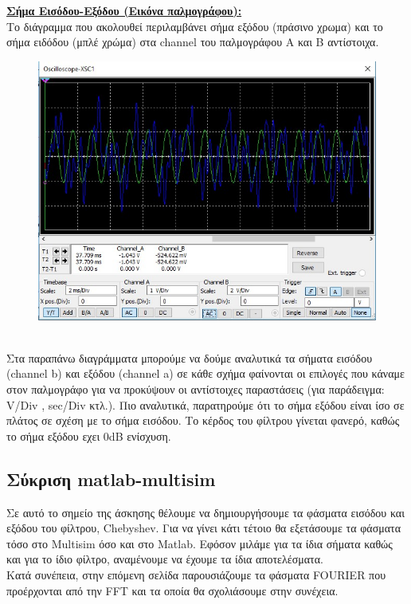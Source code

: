 \documentclass{article}
\begin{document}
{\begin{figure}[h!]
\end{figure} 
 \clearpage
 \textbf{\underline{Σήμα Εισόδου-Εξόδου (Εικόνα παλμογράφου):}} 
 \\[1.4\baselineskip]
 Το διάγραμμα που ακολουθεί περιλαμβάνει  σήμα εξόδου (πράσινο χρωμα) και το σήμα ειδόδου (μπλέ χρώμα) στα channel του παλμογράφου Α και Β αντίστοιχα.  \\[0.4\baselineskip]
 \begin{figure}[h!]
\centering
 	\advance\leftskip-0.7cm
  \includegraphics[width=140mm,scale=2]{thema2/multisim10.jpg}
\end{figure}   \\[1.4\baselineskip]
Στα παραπάνω διαγράμματα μπορούμε να δούμε αναλυτικά τα σήματα εισόδου (channel b) και εξόδου (channel a) σε κάθε σχήμα φαίνονται οι επιλογές που κάναμε στον παλμογράφο για να προκύψουν οι αντίστοιχες παραστάσεις (για παράδειγμα: V/Div ,  sec/Div κτλ.).
Πιο αναλυτικά, παρατηρούμε ότι το σήμα εξόδου είναι ίσο σε πλάτος σε σχέση με το σήμα εισόδου. Το κέρδος του φίλτρου γίνεται φανερό, καθώς το σήμα εξόδου εχει 0dB ενίσχυση. 
\clearpage
\subsection*{Σύκριση matlab-multisim}
\large{}
Σε αυτό το σημείο της άσκησης θέλουμε να δημιουργήσουμε τα φάσματα εισόδου και εξόδου του φίλτρου, Chebyshev. Για να γίνει κάτι τέτοιο θα εξετάσουμε τα φάσματα τόσο στο Multisim όσο και στο Matlab. Εφόσον μιλάμε για τα ίδια σήματα καθώς και για το ίδιο φίλτρο, αναμένουμε να έχουμε τα ίδια αποτελέσματα. \\[0.4\baselineskip]
Κατά συνέπεια, στην επόμενη σελίδα παρουσιάζουμε τα φάσματα FOURIER που προέρχονται από την FFT και τα οποία θα σχολιάσουμε στην συνέχεια.
}
\end{document}
